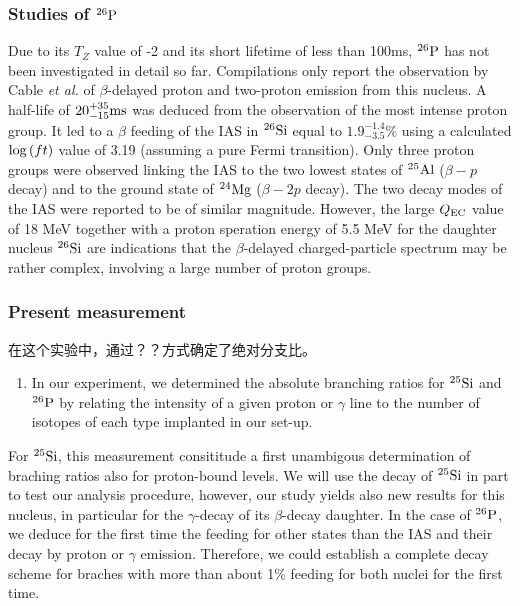 \documentclass[a4paper]{article}
\begin{document}
\subsubsection{Studies of $^{26}\textnormal{P}$}

Due to its $T_{Z}$ value of -2 and its short lifetime of less than 100ms, $^{26}\textnormal{P}$ has not been investigated in detail so far. Compilations only report the observation by Cable \textit{et al.} of $\beta$-delayed proton and two-proton emission from this nucleus. A half-life of $20_{-15}^{+35} \textnormal{ms}$ was deduced from the observation of the most intense proton group. It led to a $\beta$ feeding of the IAS in $^{26}\textnormal{Si}$ equal to $1.9_{-3.5}^{-1.4}\%$ using a calculated $\textnormal{log}\left( ft \right)$ value of 3.19 (assuming a pure Fermi transition). Only three proton groups were observed linking the IAS to the two lowest states of $^{25}\textnormal{Al}$ ($\beta-p$ decay) and to the ground state of $^{24}\textnormal{Mg}$ ($\beta-2p$ decay). The two decay modes of the IAS were reported to be of similar magnitude. However, the large $Q_{\textnormal{EC}}$ value of 18 MeV together with a proton speration energy of 5.5 MeV for the daughter nucleus $^{26}\textnormal{Si}$ are indications that the $\beta$-delayed charged-particle spectrum may be rather complex, involving a large number of proton groups.

\subsubsection{Present measurement}

在这个实验中，通过？？方式确定了绝对分支比。
\begin{enumerate}
    \item In our experiment, we determined the absolute branching ratios for $^{25}\textnormal{Si}$ and $^{26}\textnormal{P}$ by relating the intensity of a given proton or $\gamma$ line to the number of isotopes of each type implanted in our set-up. 
\end{enumerate}
For $^{25}\textnormal{Si}$, this measurement consititude a first unambigous determination of braching ratios also for proton-bound levels. We will use the decay of $^{25}\textnormal{Si}$ in part to test our analysis procedure, however, our study yields also new results for this nucleus, in particular for the $\gamma$-decay of its $\beta$-decay daughter. In the case of $^{26}\textnormal{P}$, we deduce for the first time the feeding for other states than the IAS and their decay by proton or $\gamma$ emission. Therefore, we could establish a complete decay scheme for braches with more than about 1\% feeding for both nuclei for the first time.
\end{document}

